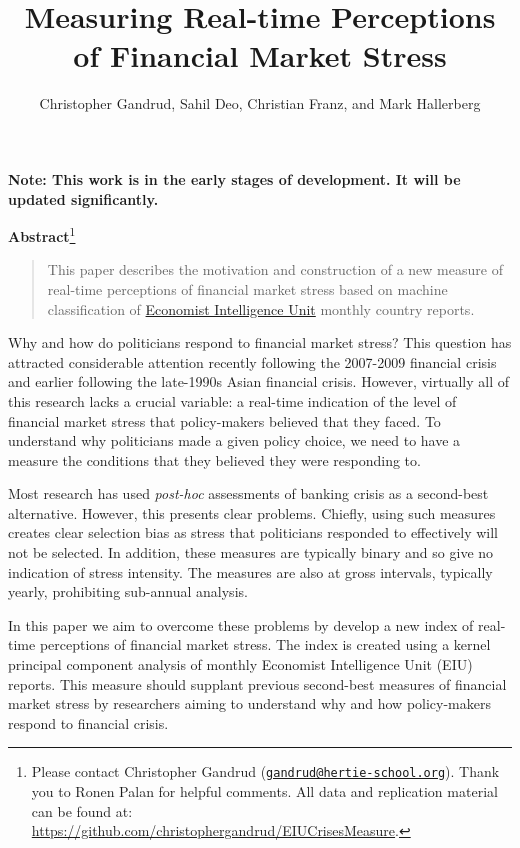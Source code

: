 \documentclass[]{article}
\title{Measuring Real-time Perceptions of Financial Market Stress}
\author{Christopher Gandrud, Sahil Deo, Christian Franz, and Mark Hallerberg}
\date{}
\let\rmarkdownfootnote\footnote%
\def\footnote{\protect\rmarkdownfootnote}
\begin{document}
\maketitle


\textbf{Note: This work is in the early stages of development. It will
be updated significantly.}

\textbf{Abstract}\footnote{Please contact Christopher Gandrud
  (\href{mailto:gandrud@hertie-school.org}{\nolinkurl{gandrud@hertie-school.org}}).
  Thank you to Ronen Palan for helpful comments. All data and
  replication material can be found at:
  \url{https://github.com/christophergandrud/EIUCrisesMeasure}.}

\begin{quote}
This paper describes the motivation and construction of a new measure of
real-time perceptions of financial market stress based on machine
classification of \href{http://www.eiu.com/}{Economist Intelligence
Unit} monthly country reports.
\end{quote}

Why and how do politicians respond to financial market stress? This
question has attracted considerable attention recently following the
2007-2009 financial crisis and earlier following the late-1990s Asian
financial crisis. However, virtually all of this research lacks a
crucial variable: a real-time indication of the level of financial
market stress that policy-makers believed that they faced. To understand
why politicians made a given policy choice, we need to have a measure
the conditions that they believed they were responding to.

Most research has used \emph{post-hoc} assessments of banking crisis as
a second-best alternative. However, this presents clear problems.
Chiefly, using such measures creates clear selection bias as stress that
politicians responded to effectively will not be selected. In addition,
these measures are typically binary and so give no indication of stress
intensity. The measures are also at gross intervals, typically yearly,
prohibiting sub-annual analysis.

In this paper we aim to overcome these problems by develop a new index
of real-time perceptions of financial market stress. The index is
created using a kernel principal component analysis of monthly Economist
Intelligence Unit (EIU) reports. This measure should supplant previous
second-best measures of financial market stress by researchers aiming to
understand why and how policy-makers respond to financial crisis.
\end{document}
